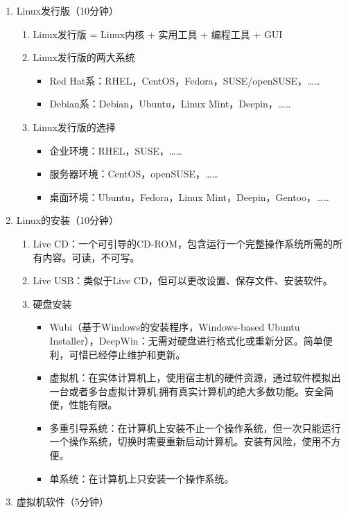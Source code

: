 \documentclass{TIJMUjiaoanSY}
\begin{document}
\noindent
\begin{enumerate}
  \item Linux发行版（10分钟）
    \begin{enumerate}
      \item Linux发行版 = Linux内核 + 实用工具 + 编程工具 + GUI
      \item Linux发行版的两大系统
        \begin{itemize}
          \item Red Hat系：RHEL，CentOS，Fedora，SUSE/openSUSE，……
          \item Debian系：Debian，Ubuntu，Linux Mint，Deepin，……
        \end{itemize}
      \item Linux发行版的选择
        \begin{itemize}
          \item 企业环境：RHEL，SUSE，……
          \item 服务器环境：CentOS，openSUSE，……
          \item 桌面环境：Ubuntu，Fedora，Linux Mint，Deepin，Gentoo，……
        \end{itemize}
    \end{enumerate}
  \item Linux的安装（10分钟）
    \begin{enumerate}
      \item Live CD：一个可引导的CD-ROM，包含运行一个完整操作系统所需的所有内容。可读，不可写。
      \item Live USB：类似于Live CD，但可以更改设置、保存文件、安装软件。
      \item 硬盘安装
	\begin{itemize}
	  \item Wubi（基于Windows的安装程序，Windows-based Ubuntu Installer），DeepWin：无需对硬盘进行格式化或重新分区。简单便利，可惜已经停止维护和更新。
	  \item 虚拟机：在实体计算机上，使用宿主机的硬件资源，通过软件模拟出一台或者多台虚拟计算机,拥有真实计算机的绝大多数功能。安全简便，性能有限。
	  \item 多重引导系统：在计算机上安装不止一个操作系统，但一次只能运行一个操作系统，切换时需要重新启动计算机。安装有风险，使用不方便。
	  \item 单系统：在计算机上只安装一个操作系统。
	\end{itemize}
    \end{enumerate}
  \item 虚拟机软件（5分钟）

\end{enumerate}
\end{document}
